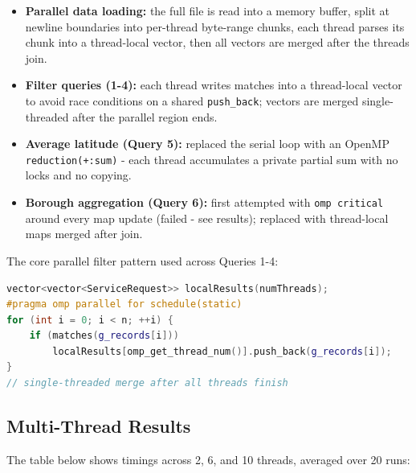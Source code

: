 \documentclass[12pt]{article}
\begin{document}
\begin{itemize}
  \item \textbf{Parallel data loading:} the full file is read into a memory
    buffer, split at newline boundaries into per-thread byte-range chunks,
    each thread parses its chunk into a thread-local vector, then all vectors
    are merged after the threads join.
  \item \textbf{Filter queries (1-4):} each thread writes matches into a
    thread-local vector to avoid race conditions on a shared
    \texttt{push\_back}; vectors are merged single-threaded after the parallel
    region ends.
  \item \textbf{Average latitude (Query 5):} replaced the serial loop with an
    OpenMP \texttt{reduction(+:sum)} - each thread accumulates a private
    partial sum with no locks and no copying.
  \item \textbf{Borough aggregation (Query 6):} first attempted with
    \texttt{omp critical} around every map update (failed - see results);
    replaced with thread-local maps merged after join.
\end{itemize}

The core parallel filter pattern used across Queries 1-4:

\begin{lstlisting}[language=C++]
vector<vector<ServiceRequest>> localResults(numThreads);
#pragma omp parallel for schedule(static)
for (int i = 0; i < n; ++i) {
    if (matches(g_records[i]))
        localResults[omp_get_thread_num()].push_back(g_records[i]);
}
// single-threaded merge after all threads finish
\end{lstlisting}

\subsection{Multi-Thread Results}

The table below shows timings across 2, 6, and 10 threads, averaged over 20
runs:
\end{document}
